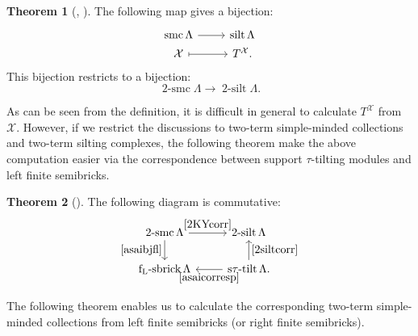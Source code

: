 \documentclass[pdftex,a4paper]{article}
\numberwithin{equation}{subsection}
\theoremstyle{definition}
\newtheorem{theorem}{Theorem}[section]
\newcommand{\silt}{\operatorname{\mathrm{silt}}}
\newcommand{\twosilt}{\operatorname{\mathrm{2-silt}}}
\newcommand{\stautilt}{\operatorname{\mathrm{s\tau-tilt}}}
\newcommand{\flsbrick}{\operatorname{\mathrm{f_L-sbrick}}}
\newcommand{\smc}{\operatorname{\mathrm{smc}}}
\newcommand{\twosmc}{\operatorname{\mathrm{2-smc}}}
\begin{document}
\begin{theorem}[{\cite[Proposition 5.9, Theorem 6.1]{MR3178243}, \cite[Corollary 4.3]{MR3220536}}]
	The following map gives a bijection:
	\begin{equation}\label{KY}
		\begin{tikzcd}[row sep=1pt]
			\smc \Lambda\ar[r]& \silt \Lambda\\
			\mathcal{X}\ar[r,mapsto]&T^\mathcal{X}.
		\end{tikzcd}
	\end{equation}
	This bijection restricts to a bijection:
	\begin{equation}\label{2KYcorr}
		\twosmc \Lambda \rightarrow \twosilt \Lambda.
	\end{equation}
\end{theorem}
As can be seen from the definition, it is difficult in general to calculate \(T^{\mathcal{X}}\) from \(\mathcal{X}\).
However, if we restrict the discussions to two-term simple-minded collections and two-term silting complexes, the following theorem make the above computation easier via the correspondence between support \(\tau\)-tilting modules and left finite semibricks.
\begin{theorem}[{\cite[Theorem 3.3]{MR4139031}}]\label{commutative}
	The following diagram is commutative:
	\begin{equation}
		\begin{tikzcd}
			\twosmc \Lambda \ar[r,"\eqref{2KYcorr}"] \ar[d,"\eqref{asaibjfl}"'] &\twosilt \Lambda \ar[d,leftarrow,"\eqref{2siltcorr}"]\\
			\flsbrick \Lambda \ar[r,leftarrow,"\eqref{asaicorresp}"'] & \stautilt \Lambda.
		\end{tikzcd}
	\end{equation}
\end{theorem}

The following theorem enables us to calculate the corresponding two-term simple-minded collections from left finite semibricks (or right finite semibricks).
\end{document}
